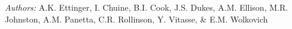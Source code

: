 \documentclass[11pt,a4paper]{letter}
\begin{document}
\begin{letter}{}
\\
\\
\noindent \emph{Authors:} A.K. Ettinger, I. Chuine, B.I. Cook, J.S. Dukes, A.M. Ellison, M.R. Johnston, A.M. Panetta, C.R. Rollinson, Y. Vitasse, \& E.M. Wolkovich
\\


\end{letter}
\end{document}
